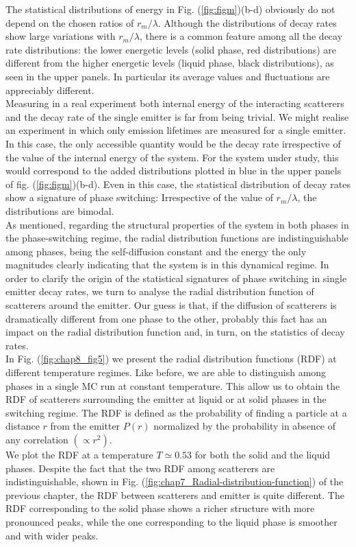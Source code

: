 The statistical distributions of energy in Fig. (\ref{fig:figm})(b-d) obviously do not depend on the chosen ratios of $r_{m}/\lambda$. Although the distributions of decay rates show large variations with $r_{m}/\lambda$, there is a common feature among all the decay rate distributions: the lower energetic levels (solid phase, red distributions) are different from the higher energetic levels (liquid phase, black distributions), as seen in the upper panels. In particular its average values and fluctuations are appreciably different.\\
Measuring in a real experiment both internal energy of the interacting scatterers and the decay rate of the single emitter is far from being trivial. We might realise an experiment in which only emission lifetimes are measured for a single emitter. In this case, the only accessible quantity would be the decay rate irrespective of the value of the internal energy of the system. For the system under study, this would correspond to the added distributions plotted in blue in the upper panels of fig. (\ref{fig:figm})(b-d). Even in this case, the statistical distribution of decay rates show a signature of phase switching: Irrespective of the value of $r_{m}/\lambda$, the distributions are bimodal. \\
As mentioned, regarding the structural properties of the system in both phases in the phase-switching regime, the radial distribution functions are indistinguishable among phases, being the self-diffusion constant and the energy the only magnitudes clearly indicating that the system is in this dynamical regime. In order to clarify the origin
of the statistical signatures of phase switching in single emitter decay rates, we turn to analyse the radial distribution function of scatterers around the emitter. Our guess is that, if the diffusion of scatterers is dramatically different from one phase to the other, probably this fact has an impact on the radial distribution function and, in turn, on the statistics of decay rates.\\
In Fig. (\ref{fig:chap8_fig5}) we present the radial distribution functions (RDF) at different temperature regimes. Like before, we are able to distinguish among phases in a single MC run at constant temperature. This allow us to obtain the RDF of scatterers surrounding the emitter at liquid or at solid phases in the switching regime. The RDF is defined as the probability of finding a particle at a distance $r$ from the emitter $P\left(r\right)$ normalized by the probability in absence of any correlation $\left(\propto r^2\right)$.\\
We plot the RDF at a temperature $T \simeq 0.53$ for both the solid and the liquid  phases. Despite the fact that the two RDF among scatterers are indistinguishable, shown in Fig. (\ref{fig:chap7_Radial-distribution-function}) of the previous chapter, the RDF between scatterers and emitter is quite different. The RDF corresponding to the solid phase shows a richer structure with more pronounced peaks, while the one corresponding to the liquid phase is smoother and with wider peaks.

